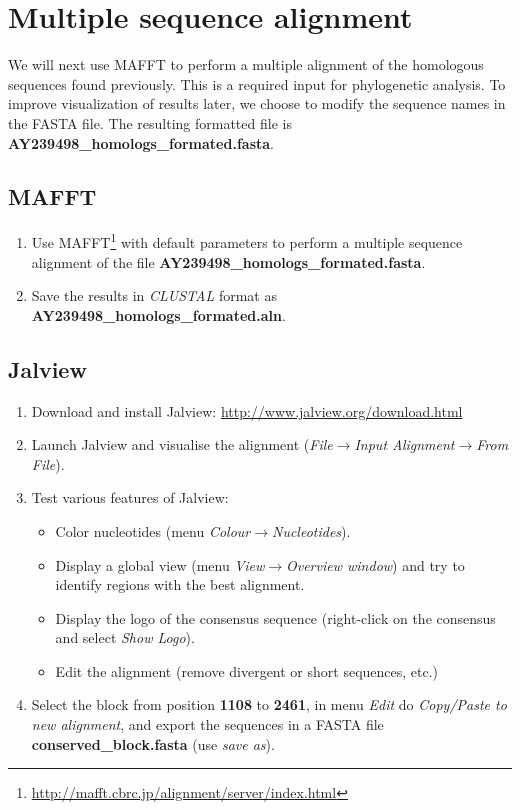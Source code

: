 \documentclass[a4paper,11pt]{article}
\begin{document}
\section{Multiple sequence alignment}

We will next use MAFFT to perform a multiple alignment of the
homologous sequences found previously. This
is a required input for phylogenetic analysis.
To improve visualization of results later, we choose to 
modify the sequence names in the FASTA file. The resulting formatted file is \textbf{AY239498\_homologs\_formated.fasta}.

\subsection{MAFFT}\label{Mafft}

\begin{enumerate}
\item Use MAFFT\footnote{\url{http://mafft.cbrc.jp/alignment/server/index.html}}
  with default parameters to perform a multiple sequence alignment of
  the file \textbf{AY239498\_homologs\_formated.fasta}. 
\item Save the results in \textit{CLUSTAL} format as \textbf{AY239498\_homologs\_formated.aln}.
\end{enumerate}


\subsection{Jalview}\label{Jalview}

\begin{enumerate}
\item Download and install Jalview:
  \url{http://www.jalview.org/download.html}
\item Launch Jalview and visualise the alignment
  (\textit{File$\rightarrow$Input Alignment$\rightarrow$From File}). 
\item Test various features of Jalview:
\begin{itemize}
\item Color nucleotides (menu \textit{Colour$\rightarrow$Nucleotides}).
\item Display a global view (menu \textit{View$\rightarrow$Overview
  window}) and try to identify regions with the best alignment. 
\item Display the logo of the consensus sequence (right-click on the consensus and select \textit{Show Logo}).
\item Edit the alignment (remove divergent or short sequences, etc.)
\end{itemize}
\item Select the block from position \textbf{1108} to \textbf{2461},
  in menu \textit{Edit} do \textit{Copy/Paste to new
alignment}, and export the sequences in a FASTA file \textbf{conserved\_block.fasta} (use
\textit{save as}).
\end{enumerate}
\end{document}
